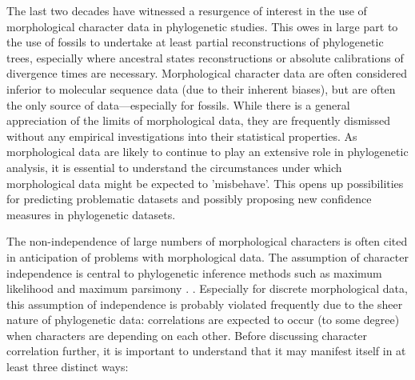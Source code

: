 \documentclass[12pt,letterpaper]{article}
\begin{document}
The last two decades have witnessed a resurgence of interest in the use of morphological character data in phylogenetic studies.
This owes in large part to the use of fossils to undertake at least partial reconstructions of phylogenetic trees, especially where ancestral states reconstructions or absolute calibrations of divergence times are necessary. 
Morphological character data are often considered inferior to molecular sequence data (due to their inherent biases), but are often the only source of data---especially for fossils.
While there is a general appreciation of the limits of morphological data, they are frequently dismissed without any empirical investigations into their statistical properties.
As morphological data are likely to continue to play an extensive role in phylogenetic analysis, it is essential to understand the circumstances under which morphological data might be expected to 'misbehave'.
This opens up possibilities for predicting problematic datasets and possibly proposing new confidence measures in phylogenetic datasets.

The non-independence of large numbers of morphological characters is often cited in anticipation of problems with morphological data.
The assumption of character independence is central to phylogenetic inference methods such as maximum likelihood and maximum parsimony . \citep[e.g.][]{joysey1982problems,felsenstein1985phylogenies,lewisa2001,felsenstein2004inferring}.
Especially for discrete morphological data, this assumption of independence is probably violated frequently due to the sheer nature of phylogenetic data: correlations are expected to occur (to some degree) when characters are depending on each other.
Before discussing character correlation further, it is important to understand that it may manifest itself in at least three distinct ways:
\end{document}
